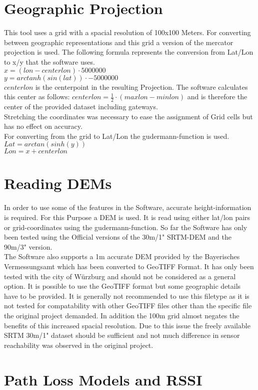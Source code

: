 \documentclass[12pt,a4paper]{article}
\begin{document}
\section{Geographic Projection}
This tool uses a grid with a spacial resolution of 100x100 Meters. For converting between geographic representations and this grid a version of the mercator projection is used. The following formula represents the conversion from Lat/Lon to x/y that the software uses.\\
$x=(lon-centerlon)\cdot5000000$\\
$y=arctanh(sin(lat))\cdot-5000000$\\
$centerlon$ is the centerpoint in the resulting Projection. The software calculates this center as follows:
$centerlon= \frac{1}{2}\cdot(maxlon - minlon)$ and is therefore the center of the provided dataset including gateways.\\
Stretching the coordinates was necessary to ease the assignment of Grid cells but has no effect on accuracy.\\
For converting from the grid to Lat/Lon the gudermann-function is used.\\
$Lat=arctan(sinh(y))$\\
$Lon=x+centerlon$
\section{Reading DEMs}
In order to use some of the features in the Software, accurate height-information is required. For this Purpose a DEM is used. It is read using either lat/lon pairs or grid-coordinates using the gudermann-function. So far the Software has only been tested using the Official versions of the 30m/1" SRTM-DEM and the 90m/3" version.
\\
The Software also supports a 1m accurate DEM provided by the Bayerisches Vermessungsamt which has been converted to GeoTIFF Format. It has only been tested with the city of Würzburg and should not be considered as a general option. It is possible to use the GeoTIFF format but some geographic details have to be provided. It is generally not recommended to use this filetype as it is not tested for compatability with other GeoTIFF files other than the specific file the original project demanded. In addition the 100m grid almost negates the benefits of this increased spacial resolution. Due to this issue the freely available SRTM 30m/1" dataset should be sufficient and not much difference in sensor reachability was observed in the original project.
\section{Path Loss Models and RSSI}
\end{document}
